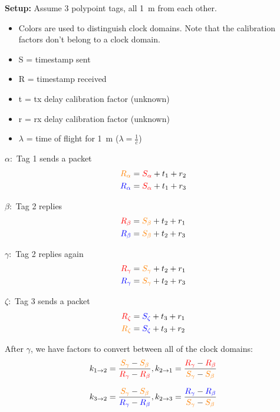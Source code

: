 \documentclass{article}
\begin{document}
\newcommand{\tda}[1]{\textcolor{red}{#1}}
\newcommand{\tdb}[1]{\textcolor{orange}{#1}}
\newcommand{\tdc}[1]{\textcolor{blue}{#1}}

\textbf{Setup:} Assume 3 polypoint tags, all 1~m from each other.

\begin{itemize}
  \item Colors are used to distinguish clock domains. Note that the
    calibration factors don't belong to a clock domain.
  \item S = timestamp sent
  \item R = timestamp received
  \item t = tx delay calibration factor (unknown)
  \item r = rx delay calibration factor (unknown)
  \item $\lambda$ = time of flight for 1~m ($\lambda = \frac{1}{c}$)
\end{itemize}

$\alpha:$ Tag 1 sends a packet
\begin{align}
  \tdb{R_\alpha} &= \tda{S_\alpha} + t_1 + r_2 \\
  \tdc{R_\alpha} &= \tda{S_\alpha} + t_1 + r_3
\end{align}

$\beta:$ Tag 2 replies
\begin{align}
  \tda{R_\beta} &= \tdb{S_\beta} + t_2 + r_1 \\
  \tdc{R_\beta} &= \tdb{S_\beta} + t_2 + r_3
\end{align}

$\gamma:$ Tag 2 replies again
\begin{align}
  \tda{R_\gamma} &= \tdb{S_\gamma} + t_2 + r_1 \\
  \tdc{R_\gamma} &= \tdb{S_\gamma} + t_2 + r_3
\end{align}

$\zeta:$ Tag 3 sends a packet
\begin{align}
  \tda{R_\zeta} &= \tdc{S_\zeta} + t_3 + r_1 \\
  \tdb{R_\zeta} &= \tdc{S_\zeta} + t_3 + r_2
\end{align}

After $\gamma$, we have factors to convert between all of the clock domains:
\[ k_{1\rightarrow2} = \frac{\tdb{S_\gamma} - \tdb{S_\beta}}{\tda{R_\gamma}-\tda{R_\beta}} ,%
   k_{2\rightarrow1} = \frac{\tda{R_\gamma}-\tda{R_\beta}}{\tdb{S_\gamma} - \tdb{S_\beta}} \]

\[ k_{3\rightarrow2} = \frac{\tdb{S_\gamma} - \tdb{S_\beta}}{\tdc{R_\gamma}-\tdc{R_\beta}} ,%
   k_{2\rightarrow3} = \frac{\tdc{R_\gamma}-\tdc{R_\beta}}{\tdb{S_\gamma} - \tdb{S_\beta}} \]
\end{document}
